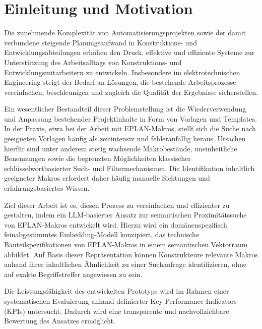 

\chapter{Einleitung und Motivation}

Die zunehmende Komplexität von Automatisierungsprojekten sowie der damit verbundene steigende Planungsaufwand in Konstruktions- und Entwicklungsabteilungen erhöhen den Druck, effektive und effiziente Systeme zur Unterstützung des Arbeitsalltags von Konstruktions- und Entwicklungsmitarbeitern zu entwickeln. Insbesondere im elektrotechnischen Engineering steigt der Bedarf an Lösungen, die bestehende Arbeitsprozesse vereinfachen, beschleunigen und zugleich die Qualität der Ergebnisse sicherstellen.

Ein wesentlicher Bestandteil dieser Problemstellung ist die Wiederverwendung und Anpassung bestehender Projektinhalte in Form von Vorlagen und Templates. In der Praxis, etwa bei der Arbeit mit EPLAN-Makros, stellt sich die Suche nach geeigneten Vorlagen häufig als zeitintensiv und fehleranfällig heraus. Ursachen hierfür sind unter anderem stetig wachsende Makrobestände, uneinheitliche Benennungen sowie die begrenzten Möglichkeiten klassischer schlüsselwortbasierter Such- und Filtermechanismen. Die Identifikation inhaltlich geeigneter Makros erfordert daher häufig manuelle Sichtungen und erfahrungsbasiertes Wissen.

Ziel dieser Arbeit ist es, diesen Prozess zu vereinfachen und effizienter zu gestalten, indem ein LLM‑basierter Ansatz zur semantischen Proximitätssuche von EPLAN-Makros entwickelt wird. Hierzu wird ein domänenspezifisch feinabgestimmtes Embedding‑Modell konzipiert, das technische Bauteilspezifikationen von EPLAN-Makros in einem semantischen Vektorraum abbildet. Auf Basis dieser Repräsentation können Konstrukteure relevante Makros anhand ihrer inhaltlichen Ähnlichkeit zu einer Suchanfrage identifizieren, ohne auf exakte Begriffstreffer angewiesen zu sein.

Die Leistungsfähigkeit des entwickelten Prototyps wird im Rahmen einer systematischen Evaluierung anhand definierter Key Performance Indicators (KPIs) untersucht. Dadurch wird eine transparente und nachvollziehbare Bewertung des Ansatzes ermöglicht.

